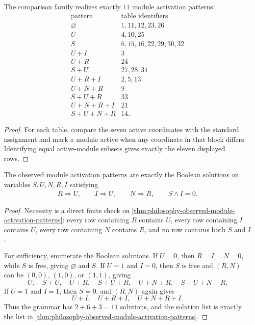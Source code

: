 \begin{theorem}
\label{thm:philosophy-observed-module-activation-patterns}
The comparison family realizes exactly $11$ module activation patterns:
$$
\begin{array}{c|l}
  \text{pattern} & \text{table identifiers}\\
\hline
  \varnothing & 1,11,12,23,26\\
  U & 4,10,25\\
  S & 6,15,16,22,29,30,32\\
  U+I & 3\\
  U+R & 24\\
  S+U & 27,28,31\\
  U+R+I & 2,5,13\\
  U+N+R & 9\\
  S+U+R & 33\\
  U+N+R+I & 21\\
  S+U+N+R & 14.
\end{array}
$$
\end{theorem}
\begin{proof}
For each table, compare the seven active coordinates with the standard
assignment and mark a module active when any coordinate in that block
differs. Identifying equal active-module subsets gives exactly the
eleven displayed rows.
\end{proof}

\begin{theorem}
\label{thm:philosophy-five-variable-activation-grammar}
The observed module activation patterns are exactly the Boolean
solutions on variables $S,U,N,R,I$ satisfying
$$
\begin{gathered}
  R\Rightarrow U,\qquad
  I\Rightarrow U,\qquad
  N\Rightarrow R,\qquad
  S\wedge I=0.
\end{gathered}
$$
\end{theorem}
\begin{proof}
Necessity is a direct finite check on
\autoref{thm:philosophy-observed-module-activation-patterns}: every row
containing $R$ contains $U$, every row containing $I$ contains $U$,
every row containing $N$ contains $R$, and no row contains both $S$ and
$I$.

For sufficiency, enumerate the Boolean solutions. If $U=0$, then
$R=I=N=0$, while $S$ is free, giving $\varnothing$ and $S$. If $U=1$
and $I=0$, then $S$ is free and $(R,N)$ can be $(0,0)$, $(1,0)$, or
$(1,1)$, giving
$$
  U,\quad S+U,\quad U+R,\quad S+U+R,\quad U+N+R,\quad S+U+N+R.
$$
If $U=1$ and $I=1$, then $S=0$, and $(R,N)$ again gives
$$
  U+I,\quad U+R+I,\quad U+N+R+I.
$$
Thus the grammar has $2+6+3=11$ solutions, and the solution list is
exactly the list in
\autoref{thm:philosophy-observed-module-activation-patterns}.
\end{proof}

